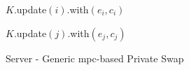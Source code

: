 \begin{figure} [H]
\begin{minipage}{0.5\textwidth}
\begin{algorithm}[H]
{            }
    
            $ K $.update$ \left( i \right) $.with$ \left( e_i, c_i \right) $
    
            $ K $.update$ \left( j \right) $.with$ \left( e_j, c_j \right) $
    
            \vspace*{0.48cm}
    
            \KwRet{}
    
        \end{algorithm}
    \end{minipage}
    \begin{minipage}{0.49\textwidth}
        \begin{algorithm}[H]
            \LinesNumbered
            \caption{Server - \newline Generic \acrshort{mpc}-based Private Swap}
            \label{algo:ServerBooleanPS}
        
    
            \vspace*{0.48cm}
    
    
            \phantom{$ e_i, c_i \gets K $.get$ \left( i \right) $}
    
            \phantom{$ s'_i \gets \CTR $-$ \Encrypt \left( e_i, c_i \right) $}
    
            \hfill
    
    
            \hfill
    
    
            \phantom{$ e_j, c_j \gets K $.get$ \left( j \right) $}
    
            \phantom{$ s'_j \gets \CTR $-$ \Encrypt \left( e_j, c_j \right) $}
    
            \hfill
    
    
            \hfill
    
            \phantom{$ e_i, c_i \gets \KeyGen \left(\right) $}
    
            \phantom{$ e_j, c_j \gets \KeyGen \left(\right) $}
    

\end{algorithm}
\end{minipage}
\end{figure}
